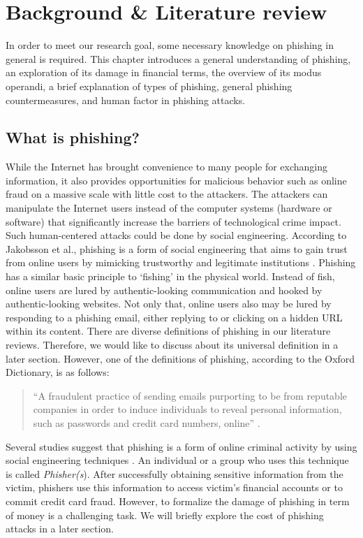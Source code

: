 
\chapter{Background \& Literature review}

In order to meet our research goal, some necessary knowledge on phishing
in general is required. This chapter introduces a general understanding
of phishing, an exploration of its damage in financial terms, the
overview of its modus operandi, a brief explanation of types of phishing,
general phishing countermeasures, and human factor in phishing attacks.


\section{What is phishing?}

While the Internet has brought convenience to many people for exchanging
information, it also provides opportunities for malicious behavior
such as online fraud on a massive scale with little cost to the attackers.
The attackers can manipulate the Internet users instead of the computer
systems (hardware or software) that significantly increase the barriers
of technological crime impact. Such human-centered attacks could be
done by social engineering. According to Jakobsson et al., phishing
is a form of social engineering that aims to gain trust from online
users by mimicking trustworthy and legitimate institutions \citep{jakobsson:2006}.
Phishing has a similar basic principle to \textquoteleft fishing\textquoteright{}
in the physical world. Instead of fish, online users are lured by
authentic-looking communication and hooked by authentic-looking websites.
Not only that, online users also may be lured by responding to a phishing
email, either replying to or clicking on a hidden URL within its content.
There are diverse definitions of phishing in our literature reviews.
Therefore, we would like to discuss about its universal definition
in a later section. However, one of the definitions of phishing, according
to the Oxford Dictionary, is as follows:
\begin{quote}
``A fraudulent practice of sending emails purporting to be from reputable
companies in order to induce individuals to reveal personal information,
such as passwords and credit card numbers, online'' \citep{oxford}. 
\end{quote}
\begin{onehalfspace}
Several studies suggest that phishing is a form of online criminal
activity by using social engineering techniques \citep{jakobsson:2006}\citep{workman:2008}\citep{jagatic2007social}\citep{chandrasekaran:2006}.
An individual or a group who uses this technique is called \emph{Phisher(s}).
After successfully obtaining sensitive information from the victim,
phishers use this information to access victim\textquoteright s financial
accounts or to commit credit card fraud. However, to formalize the
damage of phishing in term of money is a challenging task. We will
briefly explore the cost of phishing attacks in a later section.
\end{onehalfspace}

